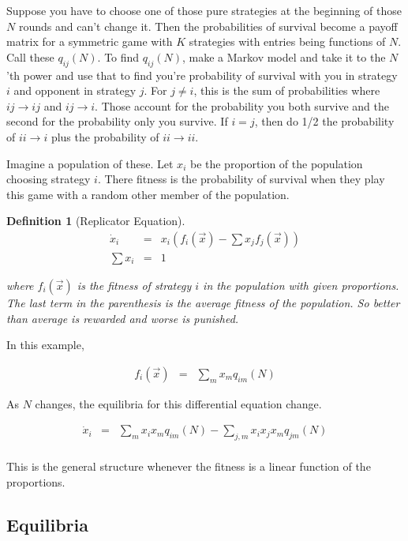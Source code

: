 \documentclass[11pt]{book}
\theoremstyle{change}
\newtheorem{definition}[equation]{Definition}
\theoremstyle{nonumberplain}
\numberwithin{equation}{section}
\begin{document}
Suppose you have to choose one of those pure strategies at the beginning of those $N$ rounds and can't change it. Then the probabilities of survival become a payoff matrix for a symmetric game with $K$ strategies with entries being functions of $N$. Call these $q_{ij} (N)$. To find $q_{ij} (N)$, make a Markov model and take it to the $N$'th power and use that to find you're probability of survival with you in strategy $i$ and opponent in strategy $j$. For $j \neq i$, this is the sum of probabilities where $ij \to ij$ and $ij \to i$. Those account for the probability you both survive and the second for the probability only you survive. If $i = j$, then do 1/2 the probability of $ii \to i$ plus the probability of $ii \to ii$.

Imagine a population of these. Let $x_i$ be the proportion of the population choosing strategy $i$. There fitness is the probability of survival when they play this game with a random other member of the population.

\begin{definition}[Replicator Equation]
\begin{eqnarray*}
\dot{x}_i &=& x_i (f_i (\vec{x}) - \sum x_j f_j (\vec{x}) )\\
\sum x_i &=& 1
\end{eqnarray*}

where $f_i (\vec{x})$ is the fitness of strategy $i$ in the population with given proportions. The last term in the parenthesis is the average fitness of the population. So better than average is rewarded and worse is punished.
\end{definition}

In this example,

\begin{eqnarray*}
f_i (\vec{x}) &=& \sum_m x_m q_{im} (N)
\end{eqnarray*}

As $N$ changes, the equilibria for this differential equation change.

\begin{eqnarray*}
\dot{x}_i &=& \sum_m x_i x_m q_{im} (N) - \sum_{j,m} x_i x_j x_m q_{jm} (N)\\
\end{eqnarray*}

This is the general structure whenever the fitness is a linear function of the proportions.

\subsection{Equilibria}
\end{document}
